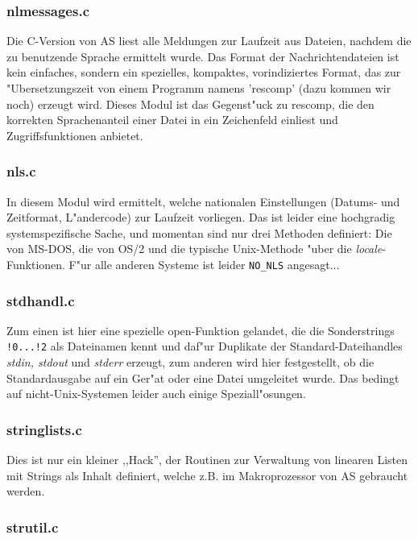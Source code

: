 \documentclass[12pt,a4paper,twoside]{report}
\begin{document}
{\subsubsection{nlmessages.c}

Die C-Version von AS liest alle Meldungen zur Laufzeit aus Dateien, nachdem
die zu benutzende Sprache ermittelt wurde.  Das Format der
Nachrichtendateien ist kein einfaches, sondern ein spezielles, kompaktes,
vorindiziertes Format, das zur "Ubersetzungszeit von einem Programm namens
'rescomp' (dazu kommen wir noch) erzeugt wird.  Dieses Modul ist das
Gegenst"uck zu rescomp, die den korrekten Sprachenanteil einer Datei in ein
Zeichenfeld einliest und Zugriffsfunktionen anbietet.

\subsubsection{nls.c}

In diesem Modul wird ermittelt, welche nationalen Einstellungen (Datums-
und Zeitformat, L"andercode) zur Laufzeit vorliegen.  Das ist leider eine
hochgradig systemspezifische Sache, und momentan sind nur drei Methoden
definiert: Die von MS-DOS, die von OS/2 und die typische Unix-Methode
"uber die {\em locale}-Funktionen.  F"ur alle anderen Systeme ist leider
\verb!NO_NLS! angesagt...

\subsubsection{stdhandl.c}

Zum einen ist hier eine spezielle open-Funktion gelandet, die die
Sonderstrings {\tt !0...!2} als Dateinamen kennt und daf"ur Duplikate der
Standard-Dateihandles {\em stdin, stdout} und {\em stderr} erzeugt, zum
anderen wird hier festgestellt, ob die Standardausgabe auf ein Ger"at oder
eine Datei umgeleitet wurde.  Das bedingt auf nicht-Unix-Systemen leider
auch einige Speziall"osungen.

\subsubsection{stringlists.c}

Dies ist nur ein kleiner ,,Hack'', der Routinen zur Verwaltung von linearen
Listen mit Strings als Inhalt definiert, welche z.B. im Makroprozessor von
AS gebraucht werden.

\subsubsection{strutil.c}

}
\end{document}
